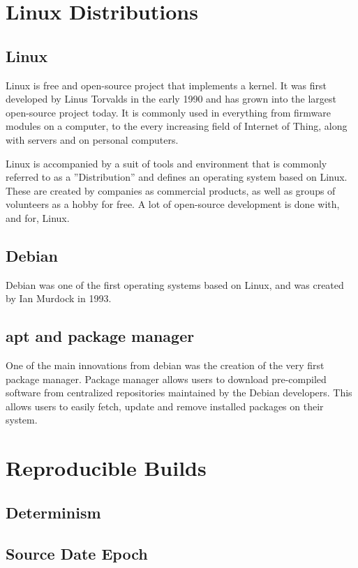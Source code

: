\documentclass[../Main/thesis.tex]{subfiles}
\begin{document}
\section{Linux Distributions}\label{sec:linux_distributions}
    \subsection*{Linux}
    Linux is free and open-source project that implements a kernel. It was first
    developed by Linus Torvalds in the early 1990 and has grown into the largest
    open-source project today. It is commonly used in everything from firmware
    modules on a computer, to the every increasing field of Internet of Thing,
    along with servers and on personal computers.

    Linux is accompanied by a suit of tools and environment that is commonly
    referred to as a ''Distribution'' and defines an operating system based on
    Linux. These are created by companies as commercial products, as well as
    groups of volunteers as a hobby for free. A lot of open-source development
    is done with, and for, Linux.

    \subsection*{Debian}
    Debian was one of the first operating systems based on Linux, and was
    created by Ian Murdock in 1993.

    \subsection*{apt and package manager}
    One of the main innovations from debian was the creation of the very first
    package manager. Package manager allows users to download pre-compiled
    software from centralized repositories maintained by the Debian developers.
    This allows users to easily fetch, update and remove installed packages on
    their system.


\section{Reproducible Builds}\label{sec:reproducible_builds}
    \subsection*{Determinism}
    \subsection*{Source Date Epoch}
\end{document}
